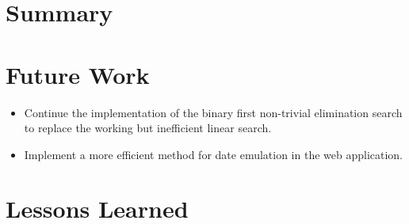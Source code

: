 \section{Summary}

\section{Future Work}

\begin{itemize}
\item Continue the implementation of the binary first non-trivial elimination
search to replace the working but inefficient linear search.
\item Implement a more efficient method for date emulation in the web
application.
\end{itemize}

\section{Lessons Learned}